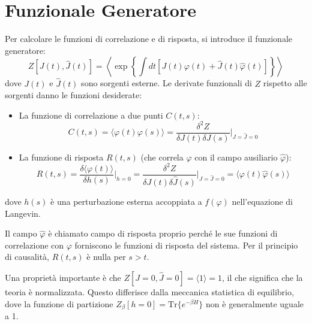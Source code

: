 \section{Funzionale Generatore}
Per calcolare le funzioni di correlazione e di risposta, si introduce il funzionale generatore:
\begin{equation}
Z[J(t),\hat{J}(t)]= \left \langle \exp \left\{\int dt[J(t)\varphi(t)+\hat{J}(t)\hat{\varphi}(t)] \right\} \right\rangle
\end{equation}
dove $J(t)$ e $\hat{J}(t)$ sono sorgenti esterne.
Le derivate funzionali di $Z$ rispetto alle sorgenti danno le funzioni desiderate:

\begin{itemize}
    \item La funzione di correlazione a due punti $C(t,s)$:
    \begin{equation}
    C(t,s)=\langle\varphi(t)\varphi(s)\rangle=\frac{\delta^{2}Z}{\delta J(t)\delta J(s)}\Big|_{J=\hat{J}=0}
    \end{equation}
    
    \item La funzione di risposta $R(t,s)$ (che correla $\varphi$ con il campo ausiliario $\hat{\varphi}$):
    \begin{equation}
    R(t,s)=\frac{\delta\langle\varphi(t)\rangle}{\delta h(s)}\Big|_{h=0}=\frac{\delta^{2}Z}{\delta J(t)\delta\hat{J}(s)}\Big|_{J=\hat{J}=0}=\langle\varphi(t)\hat{\varphi}(s)\rangle
    \end{equation}
\end{itemize}
dove $h(s)$ è una perturbazione esterna accoppiata a $f(\varphi)$ nell'equazione di Langevin.

Il campo $\hat{\varphi}$ è chiamato campo di risposta proprio perché le sue funzioni di correlazione con $\varphi$ forniscono le funzioni di risposta del sistema.
Per il principio di causalità, $R(t,s)$ è nulla per $s > t$.

Una proprietà importante è che $Z[J=0,\hat{J}=0]=\langle1\rangle=1$, il che significa che la teoria è normalizzata. Questo differisce dalla meccanica statistica di equilibrio, dove la funzione di partizione $Z_{\beta}[h=0]=\text{Tr}\{e^{-\beta H}\}$ non è generalmente uguale a 1.

